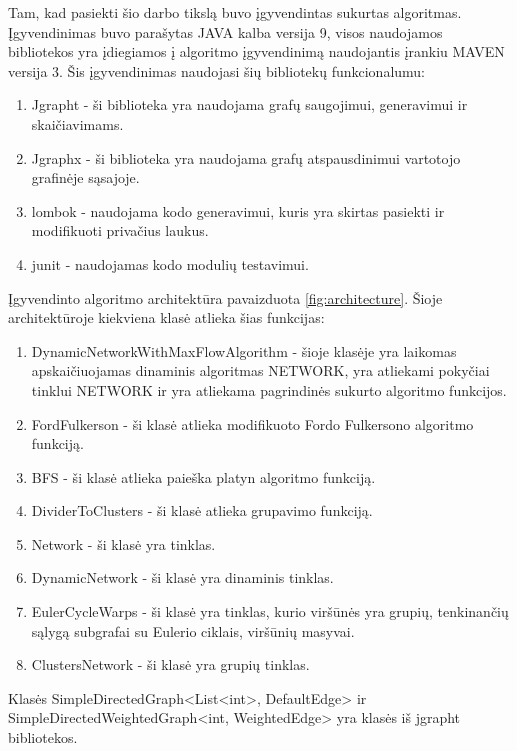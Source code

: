 Tam, kad pasiekti šio darbo tikslą buvo įgyvendintas sukurtas algoritmas. Įgyvendinimas buvo parašytas JAVA kalba versija 9, visos naudojamos bibliotekos yra įdiegiamos į algoritmo įgyvendinimą naudojantis įrankiu MAVEN versija 3. Šis įgyvendinimas naudojasi šių bibliotekų funkcionalumu: 
\begin{enumerate}
	\item Jgrapht - ši biblioteka yra naudojama grafų saugojimui, generavimui ir skaičiavimams.
	\item Jgraphx - ši biblioteka yra naudojama grafų atspausdinimui vartotojo grafinėje sąsajoje.
	\item lombok - naudojama kodo generavimui, kuris yra skirtas pasiekti ir modifikuoti privačius laukus.
	\item junit - naudojamas kodo modulių testavimui.
\end{enumerate}

Įgyvendinto algoritmo architektūra pavaizduota \ref{fig:architecture}. Šioje architektūroje kiekviena klasė atlieka šias funkcijas:
\begin{enumerate}
	\item DynamicNetworkWithMaxFlowAlgorithm - šioje klasėje yra laikomas apskaičiuojamas dinaminis algoritmas NETWORK, yra atliekami pokyčiai tinklui NETWORK ir yra atliekama pagrindinės sukurto algoritmo funkcijos.
	\item FordFulkerson - ši klasė atlieka modifikuoto Fordo Fulkersono algoritmo funkciją.
	\item BFS - ši klasė atlieka paieška platyn algoritmo funkciją.
	\item DividerToClusters - ši klasė atlieka grupavimo funkciją.
	\item Network - ši klasė yra tinklas.
	\item DynamicNetwork - ši klasė yra dinaminis tinklas.
	\item EulerCycleWarps - ši klasė yra tinklas, kurio viršūnės yra grupių, tenkinančių sąlygą subgrafai su Eulerio ciklais, viršūnių masyvai.
	\item ClustersNetwork - ši klasė yra grupių tinklas.
\end{enumerate}
Klasės SimpleDirectedGraph<List<int>, DefaultEdge> ir SimpleDirectedWeightedGraph<int, WeightedEdge> yra klasės iš jgrapht bibliotekos.